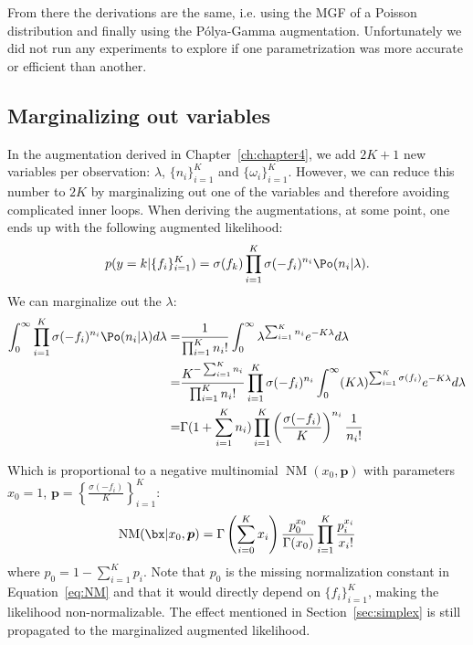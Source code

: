 From there the derivations are the same, i.e. using the \ac{MGF} of a Poisson distribution and finally using the P\'olya-Gamma augmentation.
Unfortunately we did not run any experiments to explore if one parametrization was more accurate or efficient than another.

\subsection{Marginalizing out variables}
In the augmentation derived in Chapter~\ref{ch:chapter4}, we add $2K + 1$ new variables per observation: $\lambda$, $\{n_i\}_{i=1}^K$ and $\{\omega_i\}_{i=1}^K$.
However, we can reduce this number to $2K$ by marginalizing out one of the variables and therefore avoiding complicated inner loops.
When deriving the augmentations, at some point, one ends up with the following augmented likelihood:
\begin{align}
    p(y=k|\{f_i\}_{i=1}^K) = \sigma(f_k) \prod_{i=1}^K \sigma(-f_i)^{n_i} \Po (n_i|\lambda).
\end{align}
We can marginalize out the $\lambda$:
\begin{align}
    \int_{0}^\infty \prod_{i=1}^K \sigma(-f_i)^{n_i} \Po (n_i|\lambda)d\lambda =& \frac{1}{\prod_{i=1}^K n_i!}\int_{0}^\infty \lambda^{\sum_{i=1}^K n_i}e^{-K\lambda}d\lambda \nonumber\\
    =& \frac{K^{-\sum_{i=1}^K n_i}}{\prod_{i=1}^K n_i!}\prod_{i=1}^K \sigma(-f_i)^{n_i} \int_{0}^\infty (K\lambda)^{\sum_{i=1}^K \sigma(f_i)}e^{-K\lambda}d\lambda \nonumber\\
    =& \Gamma(1 + \sum_{i=1}^K n_i) \prod_{i=1}^K \left(\frac{\sigma(-f_i)}{K}\right)^{n_i}\frac{1}{n_i!} \label{eq:NM}
\end{align}

Which is proportional to a negative multinomial $\operatorname{NM}(x_0, \boldsymbol{p})$ with parameters $x_0=1$, $\boldsymbol{p}=\left\{\frac{\sigma(-f_i)}{K}\right\}_{i=1}^K$:
\begin{align*}
    \operatorname{NM}(\bx|x_0,\boldsymbol{p}) = \Gamma\left(\sum_{i=0}^K x_i\right) \frac{p_0^{x_0}}{\Gamma(x_0)}\prod_{i=1}^K \frac{p_i^{x_i}}{x_i!}   
\end{align*}
where $p_0 = 1 - \sum_{i=1}^K p_i$.
Note that $p_0$ is the missing normalization constant in Equation~\ref{eq:NM} and that it would directly depend on $\{f_i\}_{i=1}^K$, making the likelihood non-normalizable.
The effect mentioned in Section~\ref{sec:simplex} is still propagated to the marginalized augmented likelihood.

